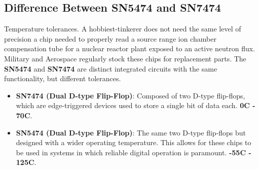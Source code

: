 \documentclass[12pt]{article}
\theoremstyle{definition}
\begin{document}
\subsection*{Difference Between SN5474 and SN7474}
Temperature tolerances. A hobbiest-tinkerer does not need the same level of precision a
chip needed to properly read a source range ion chamber compensation tube for a
nuclear reactor plant exposed to an active neutron flux. Military and Aerospace regularly stock these
chips for replacement parts.
The \textbf{SN5474} and \textbf{SN7474} are distinct integrated circuits with the same functionality, but different tolerances.
\begin{itemize}
	\item \textbf{SN7474 (Dual D-type Flip-Flop)}: Composed of two D-type flip-flops, which are edge-triggered devices used to store a single bit of data each. \textbf{0\degree C - 70\degree C}.
	\item \textbf{SN5474 (Dual D-type Flip-Flop)}: The same two D-type flip-flops but designed with a wider operating temperature. This allows for these chips to be used in systems in which reliable digital operation is paramount. \textbf{-55\degree C - 125\degree C}.
\end{itemize}
\end{document}
